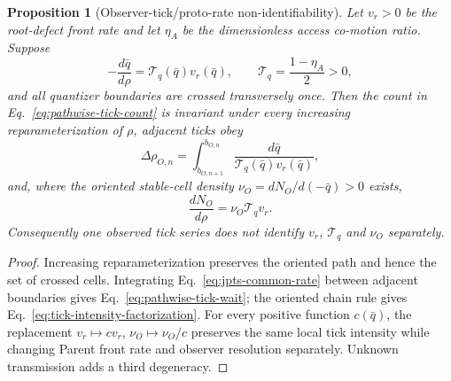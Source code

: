 \documentclass[11pt]{article}
\newtheorem{proposition}{Proposition}
\begin{document}
\begin{proposition}[Observer-tick/proto-rate non-identifiability]
Let \(v_r>0\) be the root-defect front rate and let \(\eta_A\) be the
dimensionless access co-motion ratio. Suppose
\begin{equation}
 -\frac{d\bar q}{d\rho}
 =\mathcal T_q(\bar q)v_r(\bar q),
 \qquad
 \mathcal T_q=\frac{1-\eta_A}{2}>0,
 \label{eq:jpts-common-rate}
\end{equation}
and all quantizer boundaries are crossed transversely once.  Then the count in
Eq.~\eqref{eq:pathwise-tick-count} is invariant under every increasing
reparameterization of \(\rho\), adjacent ticks obey
\begin{equation}
 \Delta\rho_{O,n}
 =\int_{b_{O,n+1}}^{b_{O,n}}
 \frac{d\bar q}{\mathcal T_q(\bar q)v_r(\bar q)},
 \label{eq:pathwise-tick-wait}
\end{equation}
and, where the oriented stable-cell density
\(\nu_O=dN_O/d(-\bar q)>0\) exists,
\begin{equation}
 \boxed{\frac{dN_O}{d\rho}=\nu_O\mathcal T_qv_r.} %
 \label{eq:tick-intensity-factorization}
\end{equation}
Consequently one observed tick series does not identify \(v_r\),
\(\mathcal T_q\) and \(\nu_O\) separately.
\end{proposition}

\begin{proof}
Increasing reparameterization preserves the oriented path and hence the set of
crossed cells.  Integrating Eq.~\eqref{eq:jpts-common-rate} between adjacent
boundaries gives Eq.~\eqref{eq:pathwise-tick-wait}; the oriented chain rule
gives Eq.~\eqref{eq:tick-intensity-factorization}.  For every positive
function \(c(\bar q)\), the replacement
\(v_r\mapsto cv_r\), \(\nu_O\mapsto\nu_O/c\) preserves the same local tick
intensity while changing Parent front rate and observer resolution
separately.  Unknown transmission adds a third degeneracy.
\end{proof}
\end{document}

